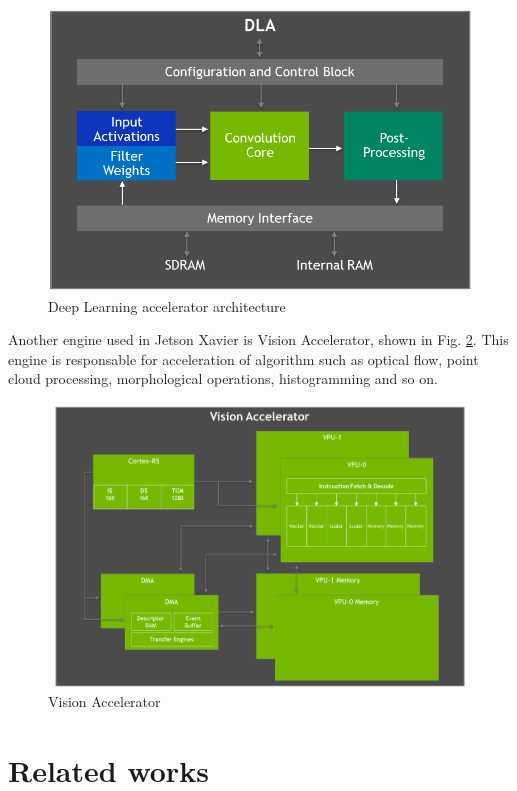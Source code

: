 \documentclass[twoside]{ctuthesis}
\theoremstyle{plain}
\theoremstyle{definition}
\theoremstyle{note}
\begin{document}
\begin{figure}[h]
\caption{Deep Learning accelerator architecture %
}
\label{fig:dla}
\includegraphics[width=.7\textwidth]{images/introduction/DLA.png}
\end{figure}


Another engine used in Jetson Xavier is Vision Accelerator, shown in Fig. \ref{fig:va}. This engine is responsable for acceleration of algorithm such as optical flow, point cloud processing, morphological operations, histogramming and so on.  

\begin{figure}[h]
\caption{Vision Accelerator %
}
\label{fig:va}
\includegraphics[width=.7\textwidth]{images/introduction/va.png}
\end{figure}
\chapter{Related works}
\label{chapter:related_works}
\end{document}

